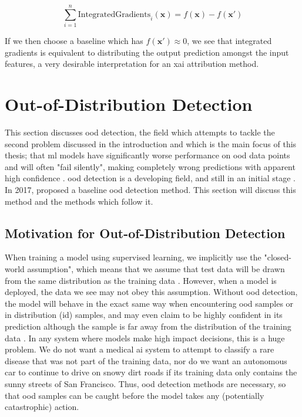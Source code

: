 \documentclass[UKenglish]{uiomasterthesis} %
\theoremstyle{definition}
\begin{document}
\begin{equation}
    \sum_{i=1}^n \text{IntegratedGradients}_i(\mathbf{x}) = f(\mathbf{x}) - f(\mathbf{x'})
\end{equation}

If we then choose a baseline which has $f(\mathbf{x'}) \approx 0$, we see that integrated gradients is equivalent to distributing the output prediction amongst the input features, a very desirable interpretation for an \ac{xai} attribution method.


\section{Out-of-Distribution Detection} \label{ood_intro}

This section discusses \ac{ood} detection, the field which attempts to tackle the second problem discussed in the introduction and which is the main focus of this thesis; that \ac{ml} models have significantly worse performance on \ac{ood} data points and will often "fail silently", making completely wrong predictions with apparent high confidence \cite{adversarial}. \ac{ood} detection is a developing field, and still in an initial stage \cite{ooddl}. In 2017, \cite{oodbaseline} proposed a baseline \ac{ood} detection method. This section will discuss this method and the methods which follow it.

\subsection{Motivation for Out-of-Distribution Detection}

When training a model using supervised learning, we implicitly use the "closed-world assumption", which means that we assume that test data will be drawn from the same distribution as the training data \cite{oodoverview}. However, when a model is deployed, the data we see may not obey this assumption. Without \ac{ood} detection, the model will behave in the exact same way when encountering \ac{ood} samples or in distribution (\ac{id}) samples, and may even claim to be highly confident in its prediction although the sample is far away from the distribution of the training data \cite[1]{energy}. In any system where models make high impact decisions, this is a huge problem. We do not want a medical \ac{ai} system to attempt to classify a rare disease that was not part of the training data, nor do we want an autonomous car to continue to drive on snowy dirt roads if its training data only contains the sunny streets of San Francisco. Thus, \ac{ood} detection methods are necessary, so that \ac{ood} samples can be caught before the model takes any (potentially catastrophic) action.
\end{document}
